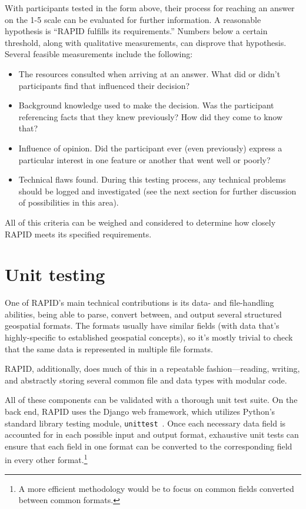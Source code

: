 With participants tested in the form above, their process for reaching an answer on the 1-5 scale can be evaluated for further information. A reasonable hypothesis is ``RAPID fulfills its requirements.'' Numbers below a certain threshold, along with qualitative measurements, can disprove that hypothesis. Several feasible measurements include the following:

\begin{itemize}
\item The resources consulted when arriving at an answer. What did or didn't participants find that influenced their decision?
\item Background knowledge used to make the decision. Was the participant referencing facts that they knew previously? How did they come to know that?
\item Influence of opinion. Did the participant ever (even previously) express a particular interest in one feature or another that went well or poorly?
\item Technical flaws found. During this testing process, any technical problems should be logged and investigated (see the next section for further discussion of possibilities in this area).
\end{itemize}

All of this criteria can be weighed and considered to determine how closely RAPID meets its specified requirements.

\section{Unit testing}
One of RAPID's main technical contributions is its data- and file-handling abilities, being able to parse, convert between, and output several structured geospatial formats. The formats usually have similar fields (with data that's highly-specific to established geospatial concepts), so it's mostly trivial to check that the same data is represented in multiple file formats.

RAPID, additionally, does much of this in a repeatable fashion---reading, writing, and abstractly storing several common file and data types with modular code.

All of these components can be validated with a thorough unit test suite. On the back end, RAPID uses the Django web framework, which utilizes Python's standard library testing module, \texttt{unittest}~\cite{DjangoTesting}. Once each necessary data field is accounted for in each possible input and output format, exhaustive unit tests can ensure that each field in one format can be converted to the corresponding field in every other format.\footnote{A more efficient methodology would be to focus on common fields converted between common formats.}

